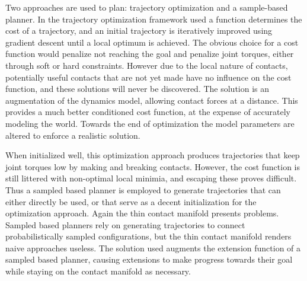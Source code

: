 \documentclass[../thesis.tex]{subfiles}
\begin{document}
Two approaches are used to plan: trajectory optimization and a sample-based planner.
In the trajectory optimization framework used a function determines the cost of a trajectory, and an initial trajectory is iteratively improved using gradient descent until a local optimum is achieved.
The obvious choice for a cost function would penalize not reaching the goal and penalize joint torques, either through soft or hard constraints.
However due to the local nature of contacts, potentially useful contacts that are not yet made have no influence on the cost function, and these solutions will never be discovered.
The solution is an augmentation of the dynamics model, allowing contact forces at a distance.
This provides a much better conditioned cost function, at the expense of accurately modeling the world.
Towards the end of optimization the model parameters are altered to enforce a realistic solution.

When initialized well, this optimization approach produces trajectories that keep joint torques low by making and breaking contacts.
However, the cost function is still littered with non-optimal local minimia, and escaping these proves difficult.
Thus a sampled based planner is employed to generate trajectories that can either directly be used, or that serve as a decent initialization for the optimization approach.
Again the thin contact manifold presents problems.
Sampled based planners rely on generating trajectories to connect probabilistically sampled configurations, but the thin contact manifold renders naive approaches useless.
The solution used augments the extension function of a sampled based planner, causing extensions to make progress towards their goal while staying on the contact manifold as necessary.
\end{document}
